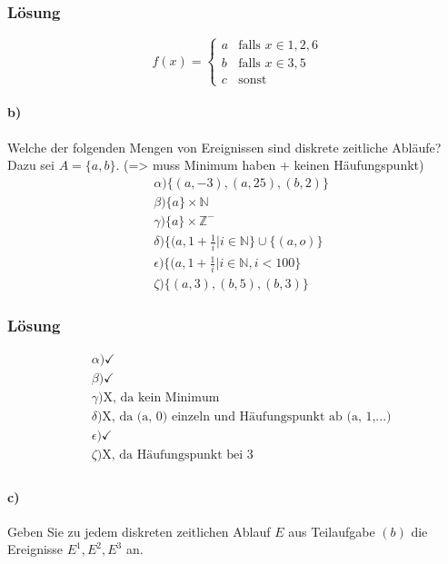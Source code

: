 \documentclass[a4paper]{scrartcl}
\begin{document}
\subsubsection*{Lösung}
\begin{equation*}
\ f(x) = 
\begin{cases}
a & \text{falls } x \in {1, 2, 6}\\
b & \text{falls } x \in {3, 5}\\
c & \text{sonst}
\end{cases}
\end{equation*}

\paragraph{b)} Welche der folgenden Mengen von Ereignissen sind diskrete zeitliche Abläufe? Dazu sei $ A = \{a, b\} $.  
(=> muss Minimum haben + keinen Häufungspunkt)
\begin{align*}
& \alpha ) \{ (a, -3), (a, 25), (b, 2) \} \\
& \beta ) \{ a \} \times \mathbb{N} \\
& \gamma ) \{ a \} \times \mathbb{Z}^- \\
& \delta ) \{ (a, 1+ \frac{1}{i} | i \in \mathbb{N} \} \cup \{ (a, o ) \} \\
& \epsilon ) \{ (a, 1+ \frac{1}{i} | i \in \mathbb{N} , i < 100 \} \\
& \zeta ) \{ (a, 3), (b, 5), (b, 3) \}
\end{align*}
 
\subsubsection*{Lösung}
\begin{align*}
& \alpha ) \checkmark \\
& \beta ) \checkmark\\
& \gamma ) \text{X} \text{, da kein Minimum} \\
& \delta ) \text{X} \text{, da (a, 0) einzeln und Häufungspunkt ab (a, 1,...)} \\
& \epsilon ) \checkmark \\
& \zeta ) \text{X} \text{, da Häufungspunkt bei 3} \\
\end{align*}

\paragraph{c)} Geben Sie zu jedem diskreten zeitlichen Ablauf $ E $ aus Teilaufgabe $ (b) $ die Ereignisse $E^1, E^2, E^3 $ an.
\end{document}
